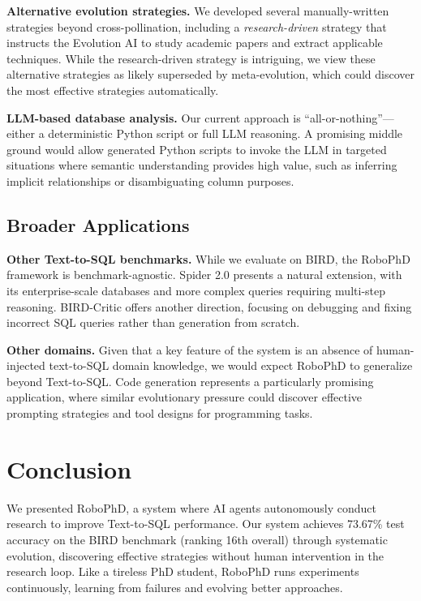 \documentclass{article}
\begin{document}
\textbf{Alternative evolution strategies.} We developed several manually-written strategies beyond cross-pollination, including a \emph{research-driven} strategy that instructs the Evolution AI to study academic papers and extract applicable techniques. While the research-driven strategy is intriguing, we view these alternative strategies as likely superseded by meta-evolution, which could discover the most effective strategies automatically.

\textbf{LLM-based database analysis.} Our current approach is ``all-or-nothing''---either a deterministic Python script or full LLM reasoning. A promising middle ground would allow generated Python scripts to invoke the LLM in targeted situations where semantic understanding provides high value, such as inferring implicit relationships or disambiguating column purposes.

\subsection{Broader Applications}
\label{subsec:broader-applications}

\textbf{Other Text-to-SQL benchmarks.} While we evaluate on BIRD, the RoboPhD framework is benchmark-agnostic. Spider 2.0 \citep{spider2} presents a natural extension, with its enterprise-scale databases and more complex queries requiring multi-step reasoning. BIRD-Critic \citep{swesql} offers another direction, focusing on debugging and fixing incorrect SQL queries rather than generation from scratch.

\textbf{Other domains.} Given that a key feature of the system is an absence of human-injected text-to-SQL domain knowledge, we would expect RoboPhD to generalize beyond Text-to-SQL. Code generation represents a particularly promising application, where similar evolutionary pressure could discover effective prompting strategies and tool designs for programming tasks.

\section{Conclusion}

We presented RoboPhD, a system where AI agents autonomously conduct research to improve Text-to-SQL performance. 
Our system achieves 73.67\% test accuracy on the BIRD benchmark (ranking 16th overall) through systematic evolution, discovering effective strategies without human intervention in the research loop.
Like a tireless PhD student, RoboPhD runs experiments continuously, learning from failures and evolving better approaches.
\end{document}
